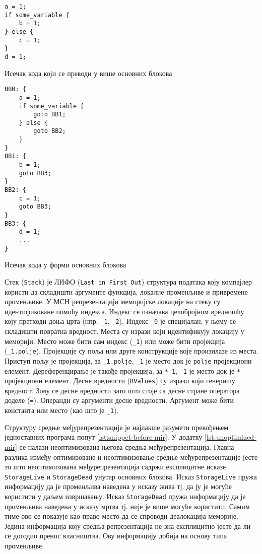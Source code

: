 \begin{listing}[H]
\begin{verbatim}
a = 1;
if some_variable {
    b = 1;
} else {
    c = 1;
}
d = 1;
\end{verbatim}
\caption{Исечак кода који се преводи у више основних блокова}
\label{lst:block_code}
\end{listing}


\begin{listing}[H]
\begin{verbatim}
BB0: {
    a = 1;
    if some_variable {
        goto BB1;
    } else {
        goto BB2;
    }
}
BB1: {
    b = 1;
    goto BB3;
}
BB2: {
    c = 1;
    goto BB3;
}
BB3: {
    d = 1;
    ...
}
\end{verbatim}
\caption{Исечак кода у форми основних блокова}
\label{lst:block_block}
\end{listing}

Стек (\verb|Stack|) је ЛИФО (\verb|Last in First Out|) структура података коју компајлер користи да складишти аргументе функција,
локалне променљиве и привремене променљиве. У МСН репрезентацији меморијске локације на стеку су идентификоване помоћу индекса. 
Индекс се означава целобројном вредношћу коју претходи доња црта (нпр. \verb|_1|, \verb|_2|). Индекс \verb|_0| је специјалан, у њему
се складишти повратна вредност. Места су изрази који идентификују локацију у меморији. Место може бити сам индекс (\verb|_1|) или може бити
пројекција (\verb|_1.polje|). Пројекције су поља или друге конструкције које произилазе из места. Приступ пољу је пројекција, за \verb|_1.polje|, \verb|_1| је место док је \verb|polje| пројекциони елемент.
Дереференцирање је такође пројекција, за \verb|*_1|, \verb|_1| је место док је \verb|*| пројекциони елемент. 
Десне вредности (\verb|RValues|) су изрази који генеришу вредност. Зову се десне вредности зато што 
стоје са десне стране оператора доделе (\verb|=|). Операнди су аргументи десне вредности. Аргумент може бити константа или место (као што је \verb|_1|).

Структуру средње међурепрезентације је најлакше разумети превођењем једноставних програма попут \ref{lst:snippet-before-mir}. У додатку \ref{lst:unoptimized-mir} се налази неоптимизована његова средња међурепрезентација. Главна разлика између оптимизоване и неоптимизовање средње међурепрезентације јесте то што неоптимизована међурепрезентација садржи експлицитне исказе \verb|StorageLive| и \verb|StorageDead| унутар основних блокова. Исказ \verb|StorageLive| пружа информацију да је променљива наведена у исказу жива тј.
да ју је могуће користити у даљем извршавању. Исказ \verb|StorageDead| пружа информацију да је променљива наведена у исказу мртва
тј. није је више могуће користити. Самим тиме ово се показује као право место да се спроводи деалокација меморије.
Једина информација коју средња репрезентација не зна експлицитно јесте да ли се догодио пренос власништва. Ову информацију добија на основу типа променљиве.

